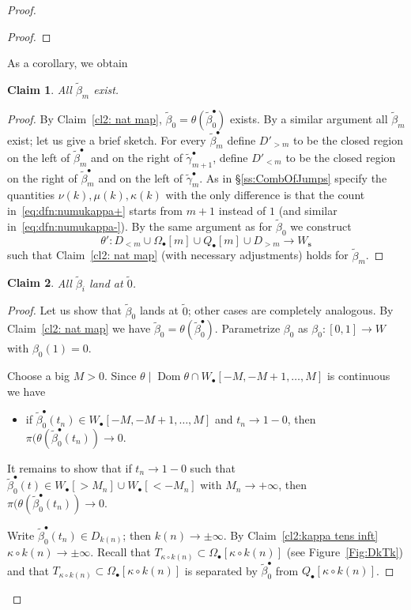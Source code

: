 \documentclass[]{amsart}
\newcommand{\Dom}{\operatorname {Dom}}
\newcommand\seq{{\operatorname{\mathbf s}}}
\newcommand\oseq{{\bullet}}
\newcommand\wall{{Q}}
\newcommand\inn{{\Omega}}
\newcommand\wbeta{{\widetilde \beta}}
\newcommand\wgamma{{\widetilde \gamma}}
\newtheorem{claim2}{Claim}
\theoremstyle{remark}
\numberwithin{equation}{section}
\theoremstyle{definition}
\begin{document}
\begin{proof}
\begin{proof}
\end{proof}
\noindent As a corollary, we obtain
\begin{claim2}
All $ \wbeta_m$ exist.
\end{claim2}
\begin{proof}
By Claim~\ref{cl2: nat map},  $ \wbeta_0=\theta(\wbeta^\oseq_0)$ exists. By a similar argument all $\widetilde \beta_m$ exist; let us give a brief sketch. For every $\wbeta^\oseq_m$  define $D'_{>m}$ to be the closed region on the left of $\wbeta^\oseq_m$ and on the right of $\wgamma^\oseq_{m+1}$, define  $D'_{<m}$ to be the closed region on the right of $\wbeta^\oseq_m$ and on the left of $\wgamma^\oseq_m$. As in \S\ref{ss:CombOfJumps} specify the quantities $\nu(k),\mu(k),\kappa(k)$ with the only difference is that the count in~\eqref{eq:dfn:numukappa+} starts from $m+1$ instead of $1$ (and similar in~\eqref{eq:dfn:numukappa-}). By the same argument as for $\wbeta_0$ we construct 
 \[\theta' \colon D_{<m}\cup \inn_{\oseq }[m]\cup \wall_{\oseq }[m]  \cup D_{>m}\to W_\seq\] 
 such that Claim~\ref{cl2: nat map} (with necessary adjustments) holds for $\wbeta_m$.
\end{proof}



\begin{claim2}
\label{cl2: beta land at 0}
All $\widetilde \beta_i$ land at $\widetilde 0$. 
\end{claim2}
\begin{proof}
Let us show that $\widetilde \beta_0$ lands at $\widetilde 0$; other cases are completely analogous. By Claim~\ref{cl2: nat map} we have $ \wbeta_0=\theta(\wbeta_0^{\oseq})$. Parametrize $\beta_0$ as $\beta_0\colon [0,1]\to W$ with $\beta_0(1)=0$.

Choose a big $M>0$. Since $\theta\mid \Dom \theta \cap W_\oseq[-M,-M+1,\dots, M]$ is continuous we have
\begin{itemize}
\item if $\wbeta^{\oseq}_0(t_n)\in W_{\oseq}[ -M, -M+1, \dots, M]$ and $t_n\to1-0$, then $\pi(\theta(\wbeta^{\oseq}_0(t_n))\to 0$.
\end{itemize}
It remains to show that if $t_n\to 1-0$ such that $\wbeta^{\oseq}_0(t)\in W_{\oseq}[>M_n]\cup W_{\oseq}[<-M_n]$ with $M_n\to +\infty$, then $\pi(\theta(\wbeta^{\oseq}_0(t_n))\to 0$. 



Write $\wbeta^{\oseq}_0(t_n)\in D_{k(n)}$; then $k(n)\to \pm \infty$. By Claim~\ref{cl2:kappa tens inft} $\kappa\circ k(n)\to \pm \infty$. Recall that $T_{\kappa\circ k(n)}\subset \inn_\oseq[\kappa\circ k(n)]$ (see Figure~\ref{Fig:DkTk}) and that $T_{\kappa\circ k(n)}\subset \inn_\oseq[\kappa\circ k(n)]$ is separated by $\wbeta_0^\oseq$ from $\wall_\oseq[\kappa\circ k(n)]$.


\end{proof}
\end{proof}
\end{document}
